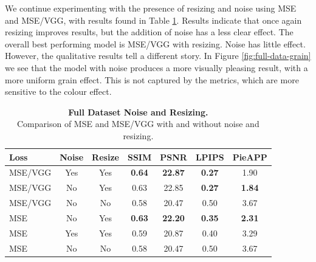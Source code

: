 We continue experimenting with the presence of resizing and noise using MSE and MSE/VGG, with results found in Table \ref{tab:full-data-resize-noise}. Results indicate that once again resizing improves results, but the addition of noise has a less clear effect. The overall best performing model is MSE/VGG with resizing. Noise has little effect. However, the qualitative results tell a different story. In Figure \ref{fig:full-data-grain} we see that the model with noise produces a more visually pleasing result, with a more uniform grain effect. This is not captured by the metrics, which are more sensitive to the colour effect.

\begin{table}
    \centering
    \captionsetup{justification=centering}
    \caption{\textbf{Full Dataset Noise and Resizing.} \\ Comparison of MSE and MSE/VGG with and without noise and resizing.}
    \setlength{\tabcolsep}{0.3em}
    \begin{tabular}{lcccccc}
        \toprule
        Loss & Noise & Resize & SSIM & PSNR & LPIPS & PieAPP \\
        \midrule
        MSE/VGG & Yes & Yes & \textbf{0.64} & \textbf{22.87} & \textbf{0.27} & 1.90 \\
        MSE/VGG & No & Yes & 0.63 & 22.85 & \textbf{0.27} & \textbf{1.84} \\
        MSE/VGG & No & No & 0.58 & 20.47 & 0.50 & 3.67 \\
        \midrule
        MSE & No & Yes & \textbf{0.63} & \textbf{22.20} & \textbf{0.35} & \textbf{2.31} \\
        MSE & Yes & Yes & 0.59 & 20.87 & 0.40 & 3.29 \\
        MSE & No & No & 0.58 & 20.47 & 0.50 & 3.67 \\
        \bottomrule
    \end{tabular}
    \label{tab:full-data-resize-noise}
\end{table}

